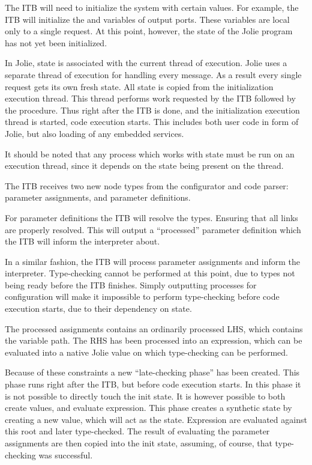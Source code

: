
The ITB will need to initialize the system with certain values. For example,
the ITB will initialize the  and  variables
of output ports. These variables are local only to a single request. At this
point, however, the state of the Jolie program has not yet been initialized.

In Jolie, state is associated with the current thread of execution. Jolie uses
a separate thread of execution for handling every message. As a result every
single request gets its own fresh state. All state is copied from the
initialization execution thread. This thread performs work requested by the ITB
followed by the  procedure. Thus right after the ITB is done, and
the initialization execution thread is started, code execution starts. This
includes both user code in form of Jolie, but also loading of any embedded
services.

It should be noted that any process which works with state must be run on an
execution thread, since it depends on the state being present on the thread.


The ITB receives two new node types from the configurator and code parser:
parameter assignments, and parameter definitions.

For parameter definitions the ITB will resolve the types. Ensuring that all
links are properly resolved. This will output a ``processed'' parameter
definition which the ITB will inform the interpreter about.

In a similar fashion, the ITB will process parameter assignments and inform the
interpreter. Type-checking cannot be performed at this point, due to types not
being ready before the ITB finishes. Simply outputting processes for
configuration will make it impossible to perform type-checking before code
execution starts, due to their dependency on state.

The processed assignments contains an ordinarily processed LHS, which contains
the variable path. The RHS has been processed into an expression, which can be
evaluated into a native Jolie value on which type-checking can be performed.


Because of these constraints a new ``late-checking phase'' has been created.
This phase runs right after the ITB, but before code execution starts. In this
phase it is not possible to directly touch the init state. It is however
possible to both create values, and evaluate expression. This phase creates a
synthetic state by creating a new value, which will act as the state.
Expression are evaluated against this root and later type-checked. The result
of evaluating the parameter assignments are then copied into the init state,
   assuming, of course, that type-checking was successful.

